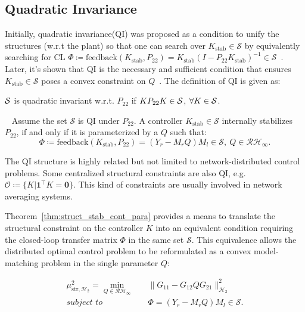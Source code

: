 \subsection{Quadratic Invariance}\label{subsec::QI}
Initially, quadratic invariance(QI) was proposed as a condition to unify the structures (w.r.t the plant) so that one can search over \(K_{\mathrm{stab}}\in \mathcal{S}\) by equivalently searching for CL \(\Phi \coloneqq \mathrm{feedback}(K_\mathrm{stab},P_{22}) = K_\mathrm{stab}( I - P_{22} K_\mathrm{stab})^{-1} \in \mathcal{S}\)~\cite{SanjayLQIsufficient}. Later, it's shown that QI is the necessary and sufficient condition that ensures \(K_\mathrm{stab} \in \mathcal{S}\) poses a convex constraint on \(Q\)~\cite{LessardQI, Sabau2011Vec}. The definition of QI is given as: 
\begin{defn}
${\cal S}$ is quadratic invariant w.r.t. $P_{22}$ if \(KP_{22}K\in {\cal S}\), \(\forall K\in {\cal S}\).
\end{defn}
\begin{thm}~\cite{Sabau2011Vec}\label{thm:struct_stab_cont_para}
Assume the set \(\mathcal{S}\) is QI under \(P_{22}\).
A controller \(K_\mathrm{stab} \in \mathcal{S}\) internally stabilizes \(P_{22}\), if and only if it is parameterized by a \(Q\) such that:
\begin{equation*}
\Phi \coloneqq \mathrm{feedback}(K_\mathrm{stab},P_{22}) = (Y_r -M_r Q)M_l \in \mathcal{S} 
,\ Q\in \mathcal{RH}_\infty.   
\end{equation*}
\end{thm}
\begin{rem}
The QI structure is highly related but not limited to network-distributed control problems. Some centralized structural constraints are also QI, e.g. \(\mathcal{O} \coloneqq \{K\vert\mathbf{1}^\top K =\mathbf{0}\}\). This kind of constraints are usually involved in network averaging systems.
\end{rem}
Theorem~\ref{thm:struct_stab_cont_para} provides a means to translate the structural constraint on the controller \(K\) into an equivalent condition requiring the closed-loop transfer matrix \(\Phi\) in the same set \(\mathcal{S}\). This equivalence allows the distributed optimal control problem to be reformulated as a convex model-matching problem in the single parameter \(Q\):
\begin{opt}\label{Prob::H2minafterpara}
\begin{subequations}
\begin{align}
\mu_{\mathrm{str}, \mathcal{H}_2}^2 = \underset{Q\in\mathcal{RH}_\infty}{\min}\quad & \|G_{11} - G_{12} Q G_{21}\|_{\mathcal{H}_2}^2 \label{eqn:mmcost}\\
\textit{subject to} \quad &\Phi=(Y_r - M_r Q) M_l\in \mathcal{S} \label{eqn:mmstructconstr}.  
\end{align}
\end{subequations}
\end{opt}
